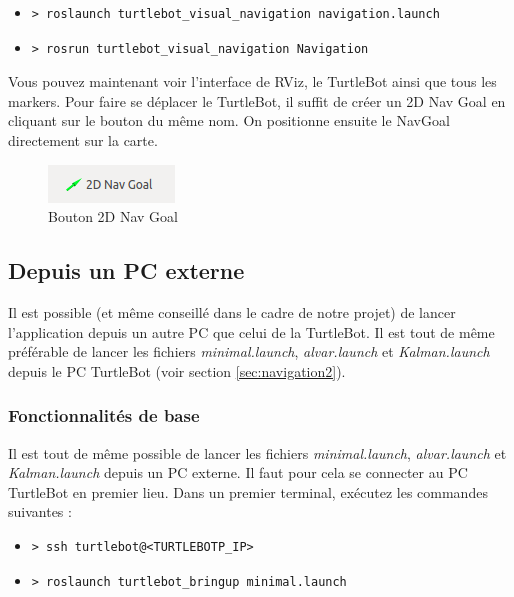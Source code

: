 \documentclass[10pt,a4paper]{article}
\begin{document}
\begin{itemize}
\item[] \begin{verbatim}> roslaunch turtlebot_visual_navigation navigation.launch \end{verbatim}
\item[]  \begin{verbatim}> rosrun turtlebot_visual_navigation Navigation \end{verbatim}
\end{itemize}

Vous pouvez maintenant voir l'interface de RViz, le TurtleBot ainsi que tous les markers.
Pour faire se déplacer le TurtleBot, il suffit de créer un 2D Nav Goal en cliquant sur le bouton du même nom. On positionne ensuite le NavGoal directement sur la carte.\\
\begin{figure}[!h]
  \centering
  \noindent\includegraphics[scale=0.5]{2DNavGoal.png} 
  \caption{Bouton 2D Nav Goal}
\end{figure}

\subsection{Depuis un PC externe}

Il est possible (et même conseillé dans le cadre de notre projet) de lancer l'application depuis un autre PC que celui de la TurtleBot.
Il est tout de même préférable de lancer les fichiers \upshape \emph{minimal.launch}, \upshape \emph{alvar.launch} et \upshape \emph{Kalman.launch} depuis le PC TurtleBot (voir section \ref{sec:navigation2}).

\subsubsection{Fonctionnalités de base}

Il est tout de même possible de lancer les fichiers \upshape \emph{minimal.launch}, \upshape \emph{alvar.launch} et \upshape \emph{Kalman.launch} depuis un PC externe. Il faut pour cela se connecter au PC TurtleBot en premier lieu.
Dans un premier terminal, exécutez les commandes suivantes :

\begin{itemize}
\item[]  \begin{verbatim}> ssh turtlebot@<TURTLEBOTP_IP> \end{verbatim}
\item[]  \begin{verbatim}> roslaunch turtlebot_bringup minimal.launch \end{verbatim}
\end{itemize}
\end{document}
